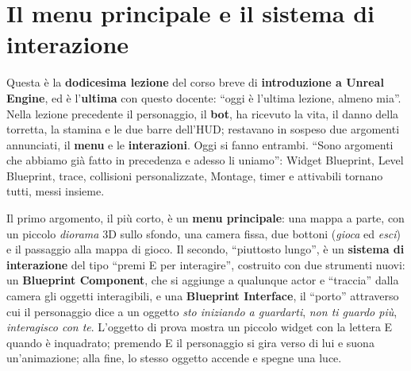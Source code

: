 %
%    
%

\chapter[Menu e sistema di interazione]{Il menu principale e il sistema di
interazione}
\label{ue12:cap:interazione}

Questa è la \textbf{dodicesima lezione} del corso breve di \textbf{introduzione a Unreal
Engine}, ed è l'\textbf{ultima} con questo docente: ``oggi è l'ultima lezione, almeno
mia''. Nella lezione precedente il personaggio, il \textbf{bot}, ha ricevuto la vita, il
danno della torretta, la stamina e le due barre dell'HUD; restavano in sospeso due
argomenti annunciati, il \textbf{menu} e le \textbf{interazioni}. Oggi si fanno entrambi.
``Sono argomenti che abbiamo già fatto in precedenza e adesso li uniamo'': Widget
Blueprint, Level Blueprint, trace, collisioni personalizzate, Montage, timer e attivabili
tornano tutti, messi insieme.

Il primo argomento, il più corto, è un \textbf{menu principale}: una mappa a parte, con un
piccolo \emph{diorama} 3D sullo sfondo, una camera fissa, due bottoni (\emph{gioca} ed
\emph{esci}) e il passaggio alla mappa di gioco. Il secondo, ``piuttosto lungo'', è un
\textbf{sistema di interazione} del tipo ``premi E per interagire'', costruito con due
strumenti nuovi: un \textbf{Blueprint Component}, che si aggiunge a qualunque actor e
``traccia'' dalla camera gli oggetti interagibili, e una \textbf{Blueprint Interface}, il
``porto'' attraverso cui il personaggio dice a un oggetto \emph{sto iniziando a guardarti},
\emph{non ti guardo più}, \emph{interagisco con te}. L'oggetto di prova mostra un piccolo
widget con la lettera E quando è inquadrato; premendo E il personaggio si gira verso di lui
e suona un'animazione; alla fine, lo stesso oggetto accende e spegne una luce.

